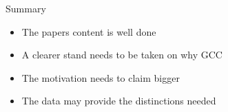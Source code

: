 \documentclass[xcolor=table]{beamer}
\begin{document}

\begin{frame}{Summary}
\begin{itemize}[<+->]
	\item The papers content is well done
	\item A clearer stand needs to be taken on why GCC
	\item The motivation needs to claim bigger
	\item The data may provide the distinctions needed
\end{itemize}
\end{frame}
\end{document}
